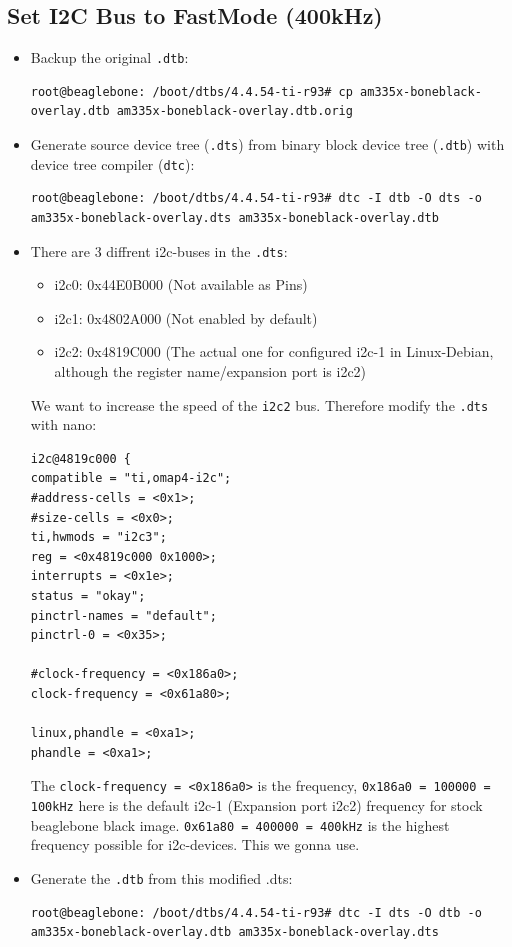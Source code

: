 \documentclass[
	fontsize=10pt
	paper=a4
]{scrartcl}
\begin{document}
\subsection{Set I2C Bus to FastMode (400kHz)}
\begin{itemize}
\item Backup the original \texttt{.dtb}:
\begin{lstlisting}
root@beaglebone: /boot/dtbs/4.4.54-ti-r93# cp am335x-boneblack-overlay.dtb am335x-boneblack-overlay.dtb.orig
\end{lstlisting}

\item Generate source device tree (\texttt{.dts}) from  binary block device tree (\texttt{.dtb}) with device tree compiler (\texttt{dtc}):
\begin{lstlisting}
root@beaglebone: /boot/dtbs/4.4.54-ti-r93# dtc -I dtb -O dts -o am335x-boneblack-overlay.dts am335x-boneblack-overlay.dtb
\end{lstlisting}

\item There are 3 diffrent i2c-buses in the \texttt{.dts}:
\begin{itemize}
	\item i2c0: 0x44E0B000 (Not available as Pins)
	\item i2c1: 0x4802A000 (Not enabled by default)
	\item i2c2: 0x4819C000 (The actual one for configured i2c-1 in Linux-Debian, although the register name/expansion port is i2c2)
\end{itemize}
We want to increase the speed of the \texttt{i2c2} bus. 
Therefore modify the \texttt{.dts} with nano:
\begin{lstlisting}
i2c@4819c000 {
compatible = "ti,omap4-i2c";
#address-cells = <0x1>;
#size-cells = <0x0>;
ti,hwmods = "i2c3";
reg = <0x4819c000 0x1000>;
interrupts = <0x1e>;
status = "okay";
pinctrl-names = "default";
pinctrl-0 = <0x35>;

#clock-frequency = <0x186a0>;
clock-frequency = <0x61a80>;

linux,phandle = <0xa1>;
phandle = <0xa1>;
\end{lstlisting}
The \texttt{clock-frequency = <0x186a0>} is the frequency, \texttt{0x186a0 = 100000 = 100kHz} here is the default i2c-1 (Expansion port i2c2) frequency for stock beaglebone black image.
\texttt{0x61a80 = 400000 = 400kHz} is the highest frequency possible for i2c-devices.
This we gonna use. 

\item Generate the \texttt{.dtb} from this modified .dts:
\begin{lstlisting}
root@beaglebone: /boot/dtbs/4.4.54-ti-r93# dtc -I dts -O dtb -o am335x-boneblack-overlay.dtb am335x-boneblack-overlay.dts
\end{lstlisting}


\end{itemize}
\end{document}
